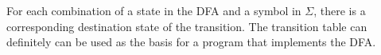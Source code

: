 
For each combination of a state in the DFA and a symbol in
$\Sigma$, there is a corresponding destination state of the transition. 
The transition table can definitely can be used as the basis for a program that
implements the DFA.



